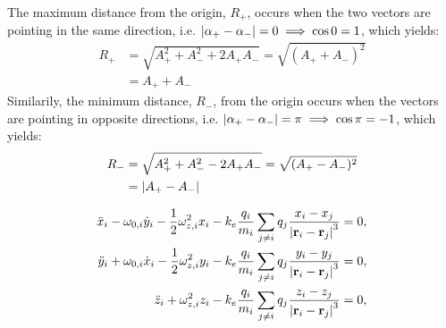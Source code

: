The maximum distance from the origin, $R_+$, occurs when the two vectors are pointing in the same direction, i.e. $\abs{\alpha_+-\alpha_-} = 0 \implies \cos0=1$, which yields:
\begin{align}
    R_+ &= \sqrt{A_+^2 + A_-^2 + 2A_+A_-} = \sqrt{(A_+ + A_-)^2} \nonumber \\
    &= A_+ + A_-
\end{align}
Similarily, the minimum distance, $R_-$, from the origin occurs when the vectors are pointing in opposite directions, i.e. $\abs{\alpha_+-\alpha_-} = \pi \implies \cos\pi=-1$, which yields:
\begin{align}
    R_- &= \sqrt{A_+^2 + A_-^2 - 2A_+A_-} = \sqrt{(A_+ - A_-)^2} \nonumber \\
    &= \abs{A_+ - A_-}
\end{align}




\begin{align}
    \ddot{x}_i - \omega_{0,i} \dot{y}_i - \frac{1}{2}\omega_{z,i}^2 x_i - k_e \frac{q_i}{m_i} \sum_{j\neq i} q_j \frac{x_i - x_j}{\abs{\mathbf{r}_i - \mathbf{r}_j}^3} =0, \label{eq:p4_diffeq_many_particles_x} \\
    \ddot{y}_i + \omega_{0,i} \dot{x}_i - \frac{1}{2}\omega_{z,i}^2 y_i - k_e \frac{q_i}{m_i} \sum_{j\neq i} q_j \frac{y_i - y_j}{\abs{\mathbf{r}_i - \mathbf{r}_j}^3} =0, \label{eq:p4_diffeq_many_particles_y} \\ 
    \ddot{z}_i + \omega_{z,i}^2 z_i - k_e \frac{q_i}{m_i} \sum_{j\neq i} q_j \frac{z_i - z_j}{\abs{\mathbf{r}_i - \mathbf{r}_j}^3} =0, \label{eq:p4_diffeq_many_particles_z}
\end{align}



